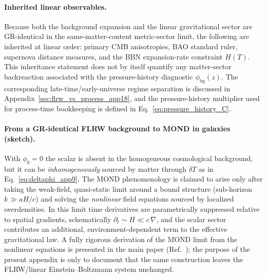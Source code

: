 \documentclass[11pt]{article}
\begin{document}
\paragraph{Inherited linear observables.}
Because both the background expansion and the linear gravitational sector are
GR-identical in the same-matter-content metric-sector limit, the following are
inherited at linear order: primary CMB anisotropies, BAO standard ruler,
supernova distance measures, and the BBN expansion-rate constraint $H(T)$.
This inheritance statement does not by itself quantify any matter-sector
backreaction associated with the pressure-history diagnostic
$\phi_{\mathrm{bg}}(z)$.  The corresponding late-time/early-universe
regime separation is discussed in Appendix~\ref{sec:flrw_vs_process_app18},
and the pressure-history multiplier used for process-time bookkeeping is
defined in Eq.~\eqref{eq:pressure_history_C}.


\paragraph{From a GR-identical FLRW background to MOND in galaxies (sketch).}
With $\phi_0=0$ the scalar is absent in the homogeneous cosmological background, but it can be
\emph{inhomogeneously} sourced by matter through $\delta T$ as in Eq.~\eqref{eq:deltaphi_app9}. The MOND
phenomenology is claimed to arise only after taking the weak-field, quasi-static limit around a
bound structure (sub-horizon $k\gg aH/c$) and solving the \emph{nonlinear} field equations sourced by
localized overdensities. In this limit time derivatives are parametrically suppressed relative to
spatial gradients, schematically $\partial_t \sim H \ll c\,\nabla$, and the scalar sector contributes
an additional, environment-dependent term to the effective gravitational law. A fully rigorous
derivation of the MOND limit from the nonlinear equations is presented in the main paper
(Ref.~\cite{Lotishvili2026}); the purpose of the present appendix is only to document that the same
construction leaves the FLRW/linear Einstein--Boltzmann system unchanged.
\end{document}
